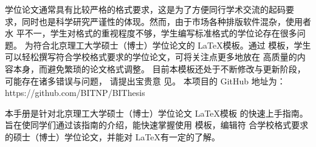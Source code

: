 \begin{conclusion}


学位论文通常具有比较严格的格式要求，这是为了方便同行学术交流的起码要
求，同时也是科学研究严谨性的体现。然而，由于市场各种排版软件混杂，使用者水
平不一，学生对格式的重视程度不够，学生编写标准格式的学位论存在很多问题。
\BIThesis 为符合北京理工大学硕士（博士）学位论文的 \LaTeX 模板。通过 \BIThesis 模板，学生可以轻松撰写符合学校格式要求的学位论文，可将关注点更多地放在
高质量的内容本身，而避免繁琐的论文格式调整。
目前本模板还处于不断修改与更新阶段，
可能存在诸多错误与问题，
请提出宝贵意
见。
本项目的 GitHub 地址为：
https://github.com/BITNP/BIThesis

本手册是针对北京理工大学硕士（博士）学位论文 \LaTeX 模板 \BIThesis 的快速上手指南。
旨在使同学们通过该指南的介绍，能快速掌握使用 \BIThesis 模板，编辑符
合学校格式要求的硕士（博士）学位论文，并能对 \LaTeX 有一定的了解。
  
\end{conclusion}
